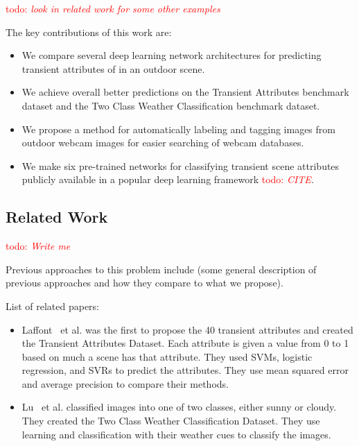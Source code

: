\documentclass{article}
\newcommand{\todo}[1]{\textcolor{red}{todo: {\em #1}}}
\begin{document}
\todo{look in related work for some other examples}

The key contributions of this work are:
\begin{itemize}

  \item We compare several deep learning network architectures for
    		predicting transient attributes of in an outdoor scene.

	\item We achieve overall better predictions on the Transient Attributes
				benchmark dataset and the Two Class Weather Classification 
				benchmark dataset.

	\item We propose a method for automatically labeling and tagging images
				from outdoor webcam images for easier searching of webcam databases.

      \item We make six pre-trained networks for classifying transient
        scene attributes publicly available in a popular deep learning
        framework \todo{CITE}.



\end{itemize}

\subsection{Related Work}

\todo{Write me}

Previous approaches to this problem include (some general description
of previous approaches and how they compare to what we propose).

List of related papers:
\begin{itemize}

	\item Laffont~\cite{Laffont14} et al. was the first to propose the 40
		transient attributes and created the Transient Attributes Dataset.
		Each attribute is given a value from 0 to 1 based on much a scene
		has that attribute. 	They used SVMs, logistic regression, and SVRs 
		to predict the attributes.  They use mean squared error and average 
		precision to compare their methods.

	\item Lu~\cite{lutwoclass} et al. classified images into one of two 
		classes, either sunny or cloudy.  They created the Two Class 
		Weather Classification Dataset.  They use learning and classification
		with their weather cues to classify the images. 

\end{itemize}
\end{document}
